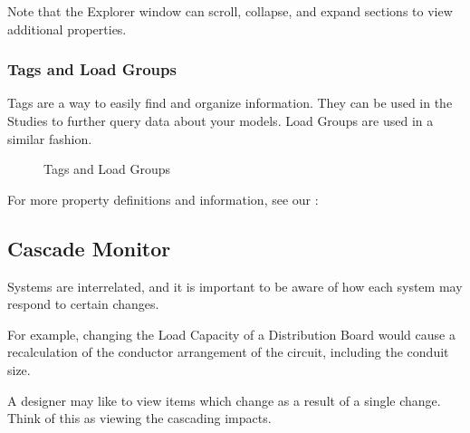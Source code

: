 \documentclass[letterpaper,10pt,english]{sphinxmanual}
\begin{document}
\begin{figure}[H]
\centering

\noindent{}
\end{figure}

Note that the Explorer window can scroll, collapse, and expand sections to view additional properties.


\subsubsection{Tags and Load Groups}
\label{\detokenize{docs/userguide/explorersandutilitytools/propertiesexplorer/index-properties_explorer:tags-and-load-groups}}
Tags are a way to easily find and organize information.  They can be used in the Studies to further query data about your models.  Load Groups are used in a similar fashion.

\begin{figure}[H]
\centering
\capstart

\noindent{}
\caption{Tags and Load Groups}\label{\detokenize{docs/userguide/explorersandutilitytools/propertiesexplorer/index-properties_explorer:id2}}\end{figure}

For more property definitions and information, see our {\hyperref[\detokenize{docs/definitions/index-definitions:definitions}]{}}:


\subsection{Cascade Monitor}
\label{\detokenize{docs/userguide/explorersandutilitytools/cascademonitor/index-cascade_monitor:cascade-monitor}}\label{\detokenize{docs/userguide/explorersandutilitytools/cascademonitor/index-cascade_monitor:id1}}\label{\detokenize{docs/userguide/explorersandutilitytools/cascademonitor/index-cascade_monitor::doc}}
Systems are interrelated, and it is important to be aware of how each system may respond to certain changes.

For example, changing the Load Capacity of a Distribution Board would cause a recalculation of the conductor arrangement of the circuit, including the conduit size.

A designer may like to view items which change as a result of a single change.  Think of this as viewing the cascading impacts.
\end{document}

